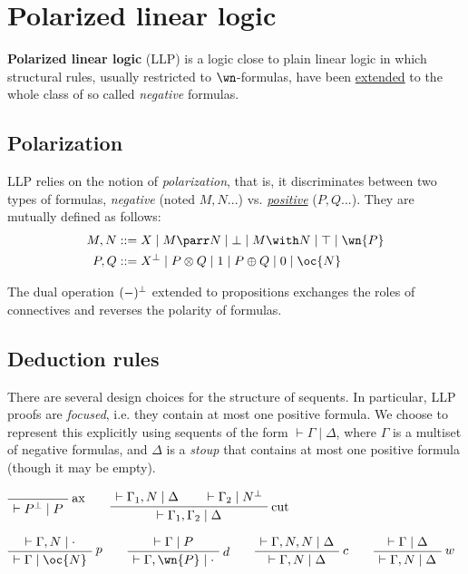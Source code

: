\chapter{Polarized linear logic}\label{polarized-linear-logic}

\textbf{Polarized linear logic} (LLP) is a logic close to plain linear
logic in which structural rules, usually restricted to \(\wn\)-formulas,
have been \hyperref[generalized-structural-rules-pos]{extended} to the
whole class of so called \emph{negative} formulas.

\section{Polarization}\label{polarization}

LLP relies on the notion of \emph{polarization}, that is, it
discriminates between two types of formulas, \emph{negative} (noted
\(M, N...\)) vs. \emph{\hyperref[positive-formula]{positive}} (\(P, Q...\)).
They are mutually defined as follows:
\begin{align*}
M, N &::= X \mid M \parr N \mid \bot \mid M \with N \mid \top \mid \wn{P} \\
P, Q &::= X\orth \mid P \otimes Q \mid 1 \mid P \oplus Q \mid 0 \mid \oc{N}
\end{align*}

The dual operation \((-)^\bot\) extended to propositions exchanges the
roles of connectives and reverses the polarity of formulas.

\section{Deduction rules}\label{deduction-rules}

There are several design choices for the structure of sequents. In
particular, LLP proofs are \emph{focused}, i.e. they contain at most
one positive formula. We choose to represent this explicitly using
sequents of the form \(\vdash\Gamma\mid\Delta\), where \(\Gamma\) is a
multiset of negative formulas, and \(\Delta\) is a \emph{stoup} that
contains at most one positive formula (though it may be empty).

\(\LabelRule{\rulename{ax}}
\NulRule{\vdash P\orth \mid P}
\DisplayProof
\qquad
\AxRule{\vdash \Gamma_1, N \mid \Delta}
\AxRule{\vdash \Gamma_2 \mid N\orth}
\LabelRule{\rulename{cut}}
\BinRule{\vdash\Gamma_1, \Gamma_2 \mid \Delta}
\DisplayProof\)

\(\AxRule{\vdash\Gamma, N\mid\cdot}
\LabelRule{p}
\UnaRule{\vdash\Gamma\mid \oc{N}}
\DisplayProof
\qquad
\AxRule{\vdash\Gamma\mid P}
\LabelRule{d}
\UnaRule{\vdash\Gamma,\wn{P}\mid \cdot}
\DisplayProof
\qquad
\AxRule{\vdash\Gamma,N,N\mid \Delta}
\LabelRule{c}
\UnaRule{\vdash\Gamma, N\mid\Delta}
\DisplayProof
\qquad
\AxRule{\vdash\Gamma\mid \Delta}
\LabelRule{w}
\UnaRule{\vdash\Gamma,N\mid\Delta}
\DisplayProof\)

